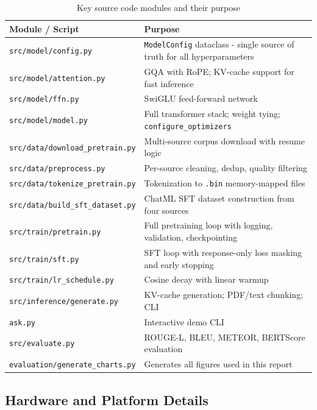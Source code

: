\documentclass[12pt]{article}
\begin{document}
\begin{table}[H]
  \centering
  \caption{Key source code modules and their purpose}
  \begin{tabular}{L{6.5cm} L{7.0cm}}
    \toprule
    \textbf{Module / Script} & \textbf{Purpose} \\
    \midrule
    \texttt{src/model/config.py} & \texttt{ModelConfig} dataclass - single source of truth for all hyperparameters \\
    \texttt{src/model/attention.py} & GQA with RoPE; KV-cache support for fast inference \\
    \texttt{src/model/ffn.py} & SwiGLU feed-forward network \\
    \texttt{src/model/model.py} & Full transformer stack; weight tying; \texttt{configure\_optimizers} \\
    \texttt{src/data/download\_pretrain.py} & Multi-source corpus download with resume logic \\
    \texttt{src/data/preprocess.py} & Per-source cleaning, dedup, quality filtering \\
    \texttt{src/data/tokenize\_pretrain.py} & Tokenization to \texttt{.bin} memory-mapped files \\
    \texttt{src/data/build\_sft\_dataset.py} & ChatML SFT dataset construction from four sources \\
    \texttt{src/train/pretrain.py} & Full pretraining loop with logging, validation, checkpointing \\
    \texttt{src/train/sft.py} & SFT loop with response-only loss masking and early stopping \\
    \texttt{src/train/lr\_schedule.py} & Cosine decay with linear warmup \\
    \texttt{src/inference/generate.py} & KV-cache generation; PDF/text chunking; CLI \\
    \texttt{ask.py} & Interactive demo CLI \\
    \texttt{src/evaluate.py} & ROUGE-L, BLEU, METEOR, BERTScore evaluation \\
    \texttt{evaluation/generate\_charts.py} & Generates all figures used in this report \\
    \bottomrule
  \end{tabular}
\end{table}

\subsection{Hardware and Platform Details}
\end{document}
